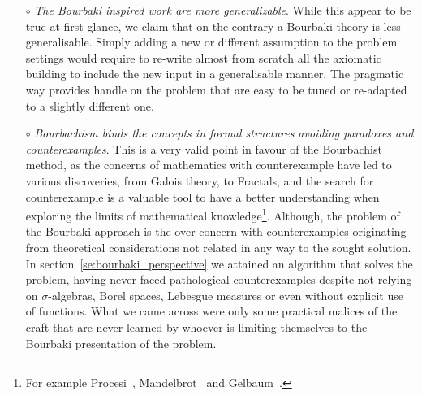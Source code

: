 \documentclass[]{scrartcl}
\theoremstyle{definition}
\begin{document}
\begin{itemize}
    The advocates of the superiority of pure mathematics\footnote{
        It is worth noticing that the academic dichotomy pure/applied maths is something that can not be found in mathematics before Bourbaki. The reader is invited to classify any of the work of Archimedes, Gauss, Euler or any other great names in the history of pre-modern mathematics as pure or applied mathematics with no ambiguities.
    } have even arrived at accusing the mathematics that have anything to do with reality of being more prone of making mistakes\footnote{
        Gros~\cite{gros2019masters} had found how even professional mathematicians can be mislead by reality. And they had leveraged on this most surprising fact, for advocating to increase the detachment. After concluding that \lq\lq [...] we can't reason in a totally abstract manner\rq\rq, instead of suggesting to take into account the reality in the mathematical practice they suggested a move towards the opposite direction: \lq\lq We have to detach ourselves from our non-mathematical intuition\rq\rq~\cite{gros2019sciencedaily}.
    }. We can be reassured by the fact that under every circumstance, the reality is adamant to persist in being what it is, and it is at this point an interesting exercise to imagine someone advocating for having medicine and engineering detached from reality.

    \item[$\circ$] \emph{The Bourbaki inspired work are more generalizable}. While this appear to be true at first glance, we claim that on the contrary a Bourbaki theory is less generalisable. Simply adding a new or different assumption to the problem settings would require to re-write almost from scratch all the axiomatic building to include the new input in a generalisable manner. The pragmatic way provides handle on the problem that are easy to be tuned or re-adapted to a slightly different one.

    \item[$\circ$] \emph{Bourbachism binds the concepts in formal structures avoiding paradoxes and counterexamples}. This is a very valid point in favour of the Bourbachist method, as the concerns of mathematics with counterexample have led to various discoveries, from Galois theory, to Fractals, and the search for counterexample is a valuable tool to have a better understanding when exploring the limits of mathematical knowledge\footnote{
        For example Procesi~\cite{procesi1977elementi}, Mandelbrot~\cite{mandelbrot1983fractal} and Gelbaum~\cite{gelbaum2003counterexamples}.
    }. Although, the problem of the Bourbaki approach is the over-concern with counterexamples originating from theoretical considerations not related in any way to the sought solution. In section~\ref{se:bourbaki_perspective} we attained an algorithm that solves the problem, having never faced pathological counterexamples despite not relying on $\sigma$-algebras, Borel spaces, Lebesgue measures or even without explicit use of functions. What we came across were only some practical malices of the craft that are never learned by whoever is limiting themselves to the Bourbaki presentation of the problem.

\end{itemize}
\end{document}
